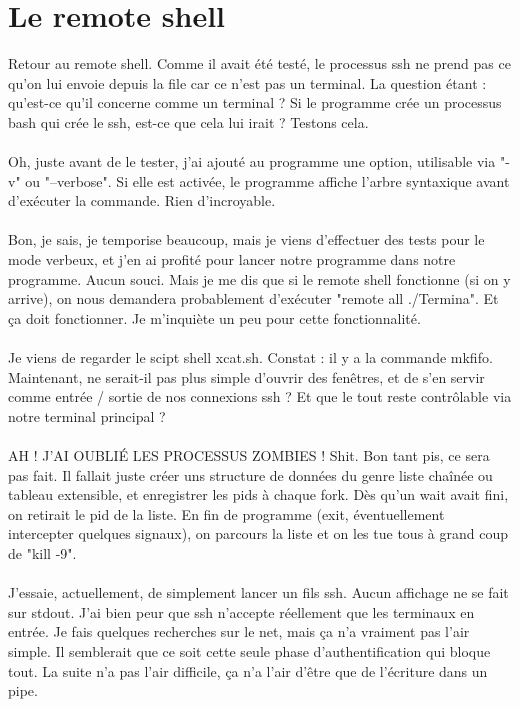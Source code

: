 \chapter[Remote shell]{Le remote shell}
Retour au remote shell. Comme il avait été testé, le processus ssh ne prend pas ce qu'on lui envoie depuis la file car ce n'est pas un terminal. La question étant : qu'est-ce qu'il concerne comme un terminal ? Si le programme crée un processus bash qui crée le ssh, est-ce que cela lui irait ? Testons cela.
\\\\
Oh, juste avant de le tester, j'ai ajouté au programme une option, utilisable via "-v" ou "--verbose". Si elle est activée, le programme affiche l'arbre syntaxique avant d'exécuter la commande. Rien d'incroyable.
\\\\
Bon, je sais, je temporise beaucoup, mais je viens d'effectuer des tests pour le mode verbeux, et j'en ai profité pour lancer notre programme dans notre programme. Aucun souci. Mais je me dis que si le remote shell fonctionne (si on y arrive), on nous demandera probablement d'exécuter "remote all ./Termina". Et ça doit fonctionner. Je m'inquiète un peu pour cette fonctionnalité.
\\\\
Je viens de regarder le scipt shell xcat.sh. Constat : il y a la commande mkfifo. Maintenant, ne serait-il pas plus simple d'ouvrir des fenêtres, et de s'en servir comme entrée / sortie de nos connexions ssh ? Et que le tout reste contrôlable via notre terminal principal ?
\\\\
AH ! J'AI OUBLIÉ LES PROCESSUS ZOMBIES ! Shit. Bon tant pis, ce sera pas fait. Il fallait juste créer uns structure de données du genre liste chaînée ou tableau extensible, et enregistrer les pids à chaque fork. Dès qu'un wait avait fini, on retirait le pid de la liste. En fin de programme (exit, éventuellement intercepter quelques signaux), on parcours la liste et on les tue tous à grand coup de "kill -9".
\\\\
J'essaie, actuellement, de simplement lancer un fils ssh. Aucun affichage ne se fait sur stdout. J'ai bien peur que ssh n'accepte réellement que les terminaux en entrée. Je fais quelques recherches sur le net, mais ça n'a vraiment pas l'air simple. Il semblerait que ce soit cette seule phase d'authentification qui bloque tout. La suite n'a pas l'air difficile, ça n'a l'air d'être que de l'écriture dans un pipe.
